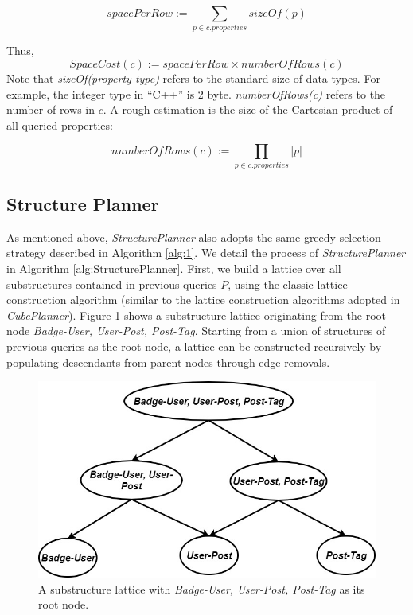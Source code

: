 \begin{displaymath}
spacePerRow:= 
\displaystyle{\sum_{p\in c.properties}sizeOf(p)}
\end{displaymath}

\noindent Thus,
\begin{displaymath}
SpaceCost(c):= spacePerRow \times numberOfRows(c)
\end{displaymath}
Note that \textit{sizeOf(property type)} refers to the standard size of data types. For example, the integer type in ``C++'' is 2 byte. \textit{numberOfRows(c)} refers to the number of rows in $c$. A rough estimation is the size of the Cartesian product of all queried properties:

\begin{displaymath}
numberOfRows(c):= \displaystyle{\prod_{p\in c.properties}|p|} 
\end{displaymath}


\subsection{Structure Planner}
\label{Structure Planner}
As mentioned above, \emph{StructurePlanner} also adopts the same greedy selection strategy described in Algorithm \ref{alg:1}. We detail the process of \emph{StructurePlanner} in Algorithm \ref{alg:StructurePlanner}. First, we build a lattice over all substructures contained in previous queries $P$, using the classic lattice construction algorithm (similar to the lattice construction algorithms adopted in \emph{CubePlanner}). Figure \ref{fig:4:3} shows a substructure lattice originating from the root node \textit{Badge-User, User-Post, Post-Tag}. Starting from a union of structures of previous queries as the root node, a lattice can be constructed recursively by populating descendants from parent nodes through edge removals.

\begin {figure}[H]
\centering
\includegraphics[scale=0.4]{pic/Structurelattice.jpg}
\caption{A substructure lattice with \textit{Badge-User, User-Post, Post-Tag} as its root node.}
\label{fig:4:3}
\end{figure}


